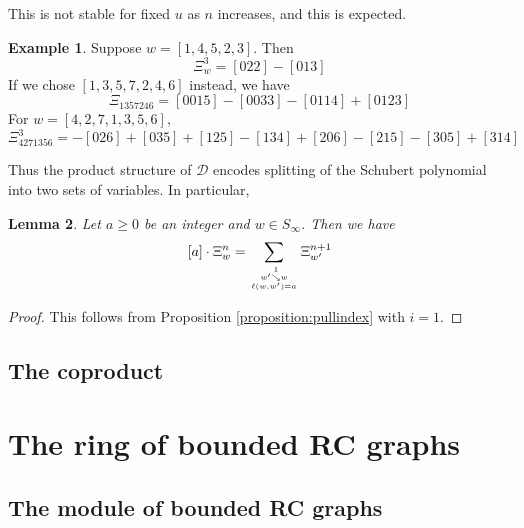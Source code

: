 \documentclass{amsart}
\newtheorem{lemma}{Lemma}[subsection]
\theoremstyle{definition}
\newtheorem{example}[lemma]{Example}
\theoremstyle{remark}
\numberwithin{equation}{subsection}
\DeclareMathOperator{\sch}{\mathfrak{S}}
\newcommand{\downvar}[1]{\stackrel{#1}{\searrow}}
\newcommand{\dsch}{\ensuremath{\Xi}}
\newcommand{\dcoma}{\mathcal{D}}
\newcommand{\code}{\mathfrak{c}}
\begin{document}

This is not stable for fixed $u$ as $n$ increases, and this is expected.


\begin{example}
Suppose $w = [1,4,5,2,3]$. Then
$$\dsch_w^3 = [022] - [013]$$
If we chose $[1,3,5,7,2,4,6]$ instead, we have
$$\dsch_{1357246} = [0015] - [0033] - [0114] + [0123]$$
For $w=[4,2,7,1,3,5,6]$,
$$\dsch_{4271356}^3 = -[026] + [035] + [125] - [134] + [206] - [215] - [305] + [314]$$
\end{example}

Thus the product structure of $\dcoma$ encodes splitting of the Schubert polynomial into two sets of variables. In particular,
\begin{lemma} \label{lemma:dpieri}
Let $a\geq 0$ be an integer and $w\in S_\infty$. Then we have
$$[a]\cdot \dsch_{w}^{n} = \sum_{w'\downvar{1} w\atop\ell(w,w')=a} \dsch_{w'}^{n+1}$$
\end{lemma}
\begin{proof}
  This follows from Proposition \ref{proposition:pullindex} with $i=1$.
\end{proof}

\subsection{The coproduct}
\section{The ring of bounded RC graphs}

\subsection{The module of bounded RC graphs}
\end{document}
